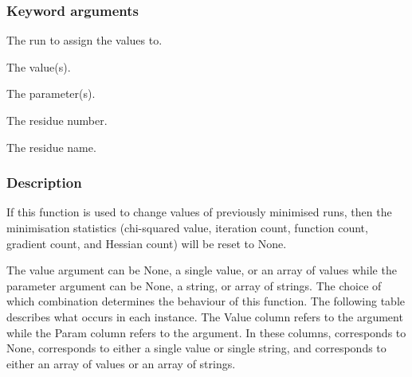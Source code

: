   
 \subsubsection{Keyword arguments} 

   The run to assign the values to.   

   The value(s).   

   The parameter(s).   

   The residue number.   

   The residue name.  

  

  
 \subsubsection{Description} 

 If this function is used to change values of previously minimised runs, then the minimisation statistics (chi-squared value, iteration count, function count, gradient count, and Hessian count) will be reset to None. 
  

 The value argument can be None, a single value, or an array of values while the parameter argument can be None, a string, or array of strings.  The choice of which combination determines the behaviour of this function.  The following table describes what occurs in each instance.  The Value column refers to the  argument while the Param column refers to the  argument.  In these columns,  corresponds to None,  corresponds to either a single value or single string, and  corresponds to either an array of values or an array of strings. 
  

